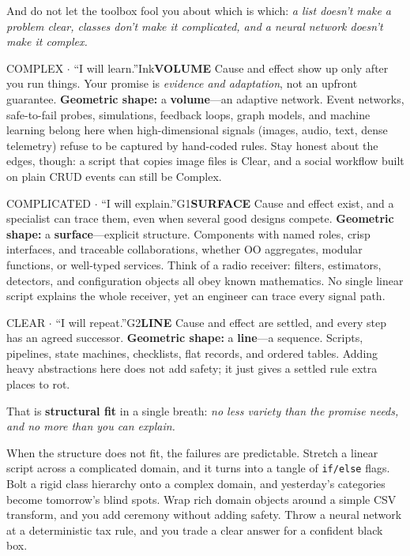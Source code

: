 \documentclass[10pt,a4paper]{article}
\newcounter{fig}
\newcommand{\code}[1]{\texttt{#1}}
\newcommand{\IconLine}{\textsf{\bfseries\scriptsize LINE}}
\newcommand{\IconSurface}{\textsf{\bfseries\scriptsize SURFACE}}
\newcommand{\IconVolume}{\textsf{\bfseries\scriptsize VOLUME}}
\begin{document}
And do not let the toolbox fool you about which is which: \emph{a list doesn't make a problem clear, classes don't make it complicated, and a neural network doesn't make it complex.}

\begin{stance}{COMPLEX \(\cdot\) ``I will learn.''}{Ink}{\IconVolume}
Cause and effect show up only after you run things. Your promise is \emph{evidence and adaptation}, not an upfront guarantee. \textbf{Geometric shape:} a \textbf{volume}—an adaptive network. Event networks, safe-to-fail probes, simulations, feedback loops, graph models, and machine learning belong here when high-dimensional signals (images, audio, text, dense telemetry) refuse to be captured by hand-coded rules. Stay honest about the edges, though: a script that copies image files is Clear, and a social workflow built on plain CRUD events can still be Complex.
\end{stance}

\begin{stance}{COMPLICATED \(\cdot\) ``I will explain.''}{G1}{\IconSurface}
Cause and effect exist, and a specialist can trace them, even when several good designs compete. \textbf{Geometric shape:} a \textbf{surface}—explicit structure. Components with named roles, crisp interfaces, and traceable collaborations, whether OO aggregates, modular functions, or well-typed services. Think of a radio receiver: filters, estimators, detectors, and configuration objects all obey known mathematics. No single linear script explains the whole receiver, yet an engineer can trace every signal path.
\end{stance}

\begin{stance}{CLEAR \(\cdot\) ``I will repeat.''}{G2}{\IconLine}
Cause and effect are settled, and every step has an agreed successor. \textbf{Geometric shape:} a \textbf{line}—a sequence. Scripts, pipelines, state machines, checklists, flat records, and ordered tables. Adding heavy abstractions here does not add safety; it just gives a settled rule extra places to rot.
\end{stance}

That is \textbf{structural fit} in a single breath: \emph{no less variety than the promise needs, and no more than you can explain.}

When the structure does not fit, the failures are predictable. Stretch a linear script across a complicated domain, and it turns into a tangle of \code{if/else} flags. Bolt a rigid class hierarchy onto a complex domain, and yesterday's categories become tomorrow's blind spots. Wrap rich domain objects around a simple CSV transform, and you add ceremony without adding safety. Throw a neural network at a deterministic tax rule, and you trade a clear answer for a confident black box.
\end{document}
